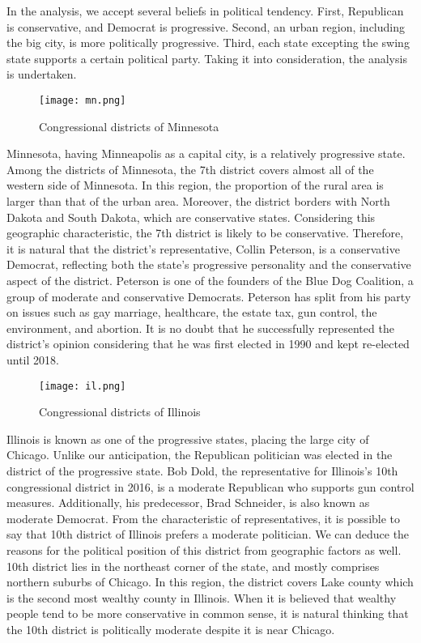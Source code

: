 \documentclass[a4paper, 11pt]{report}
\begin{document}
\begin{itemize}
\quad In the analysis, we accept several beliefs in political tendency. First, Republican is conservative, and Democrat is progressive. Second, an urban region, including the big city, is more politically progressive. Third, each state excepting the swing state supports a certain political party. Taking it into consideration, the analysis is undertaken.

\begin{figure}[h]
  \begin{center}
    \texttt{[image: mn.png]}
  \end{center}
  \caption{Congressional districts of Minnesota }
  \label{fig:mn}
\end{figure}

\quad Minnesota, having Minneapolis as a capital city, is a relatively progressive state. Among the districts of Minnesota, the 7th district covers almost all of the western side of Minnesota. In this region, the proportion of the rural area is larger than that of the urban area. Moreover, the district borders with North Dakota and South Dakota, which are conservative states. Considering this geographic characteristic, the 7th district is likely to be conservative. Therefore, it is natural that the district's representative, Collin Peterson, is a conservative Democrat, reflecting both the state's progressive personality and the conservative aspect of the district. Peterson is one of the founders of the Blue Dog Coalition, a group of moderate and conservative Democrats. Peterson has split from his party on issues such as gay marriage, healthcare, the estate tax, gun control, the environment, and abortion. It is no doubt that he successfully represented the district's opinion considering that he was first elected in 1990 and kept re-elected until 2018.

\begin{figure}[h]
  \begin{center}
    \texttt{[image: il.png]}
  \end{center}
  \caption{Congressional districts of Illinois}
  \label{fig:il}
\end{figure}

\quad Illinois is known as one of the progressive states, placing the large city of Chicago. Unlike our anticipation, the Republican politician was elected in the district of the progressive state. Bob Dold, the representative for Illinois's 10th congressional district in 2016, is a moderate Republican who supports gun control measures. Additionally, his predecessor, Brad Schneider, is also known as moderate Democrat. From the characteristic of representatives, it is possible to say that 10th district of Illinois prefers a moderate politician. We can deduce the reasons for the political position of this district from geographic factors as well. 10th district lies in the northeast corner of the state, and mostly comprises northern suburbs of Chicago. In this region, the district covers Lake county which is the second most wealthy county in Illinois. When it is believed that wealthy people tend to be more conservative in common sense, it is natural thinking that the 10th district is politically moderate despite it is near Chicago.


\end{itemize}
\end{document}
